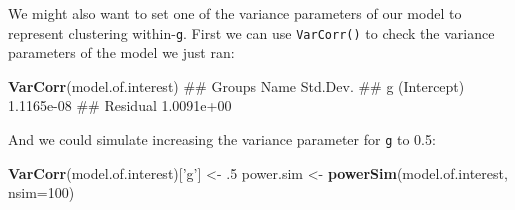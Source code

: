 \documentclass[]{article}
\newenvironment{Shaded}{\begin{snugshade}}{\end{snugshade}}
\newcommand{\KeywordTok}[1]{\textcolor[rgb]{0.13,0.29,0.53}{\textbf{#1}}}
\newcommand{\DataTypeTok}[1]{\textcolor[rgb]{0.13,0.29,0.53}{#1}}
\newcommand{\DecValTok}[1]{\textcolor[rgb]{0.00,0.00,0.81}{#1}}
\newcommand{\StringTok}[1]{\textcolor[rgb]{0.31,0.60,0.02}{#1}}
\newcommand{\NormalTok}[1]{#1}
\theoremstyle{definition}
\theoremstyle{definition}
\theoremstyle{definition}
\theoremstyle{remark}
\begin{document}
We might also want to set one of the variance parameters of our model to
represent clustering within-\texttt{g}. First we can use
\texttt{VarCorr()} to check the variance parameters of the model we just
ran:

\begin{Shaded}
\begin{Highlighting}[]
\KeywordTok{VarCorr}\NormalTok{(model.of.interest)}
\NormalTok{##  Groups   Name        Std.Dev.  }
\NormalTok{##  g        (Intercept) 1.1165e-08}
\NormalTok{##  Residual             1.0091e+00}
\end{Highlighting}
\end{Shaded}

And we could simulate increasing the variance parameter for \texttt{g}
to 0.5:

\begin{Shaded}
\begin{Highlighting}[]
\KeywordTok{VarCorr}\NormalTok{(model.of.interest)[}\StringTok{'g'}\NormalTok{] <-}\StringTok{ }\NormalTok{.}\DecValTok{5}
\NormalTok{power.sim <-}\StringTok{ }\KeywordTok{powerSim}\NormalTok{(model.of.interest, }\DataTypeTok{nsim=}\DecValTok{100}\NormalTok{)}

\end{Highlighting}
\end{Shaded}
\end{document}
